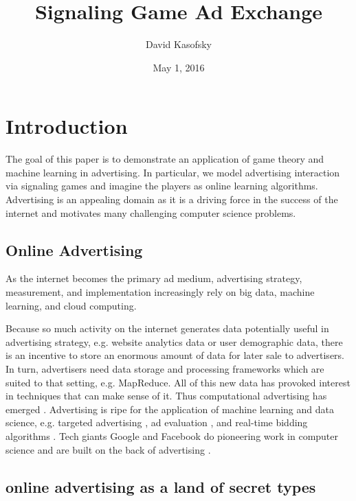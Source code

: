 \documentclass{article}
\title{Signaling Game Ad Exchange}
\author{David Kasofsky}
\date{May 1, 2016}
\begin{document}
\maketitle

\newpage

\tableofcontents

\newpage

\section{Introduction}

The goal of this paper is to demonstrate an application of game theory and machine learning in advertising. In particular, we model advertising interaction via signaling games and imagine the players as online learning algorithms. Advertising is an appealing domain as it is a driving force in the success of the internet and motivates many challenging computer science problems.

\subsection{Online Advertising}
As the internet becomes the primary ad medium\cite{iab1}, advertising strategy, measurement, and implementation increasingly rely on big data, machine learning, and cloud computing.  

Because so much activity on the internet generates data potentially useful in advertising strategy, e.g. website analytics data or user demographic data, there is an incentive to store an enormous amount of data for later sale to advertisers. In turn, advertisers need data storage and processing frameworks which are suited to that setting, e.g. MapReduce\cite{mapreduce1}. All of this new data has provoked interest in techniques that can make sense of it. Thus computational advertising has emerged \cite{bottou2013counterfactual}. Advertising is ripe for the application of machine learning and data science, e.g. targeted advertising \cite{displayadsml1}, ad evaluation \cite{abhishek2012media}, and real-time bidding algorithms \cite{yuan2014survey}. Tech giants Google and Facebook do pioneering work in computer science and are built on the back of advertising \cite{googlerevenue}.



\subsection{online advertising as a land of secret types}
\end{document}
